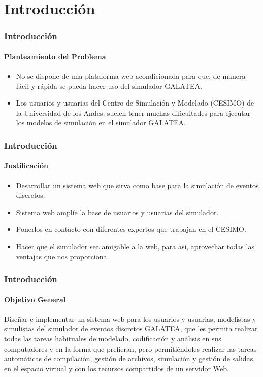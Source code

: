 \documentclass[spanish,xcolor=dvipsnames]{beamer}
\begin{document}
    \section{Introducción}
    \begin{frame}
    	\frametitle{Introducción}
    	\framesubtitle{Planteamiento del Problema}
    	
    	\begin{itemize}
    		\item No se dispone de una plataforma web acondicionada para que, de manera fácil y rápida se pueda hacer uso del simulador GALATEA.
    		\item Los usuarios y usuarias del Centro de Simulación y Modelado (CESIMO) de la Universidad de los Andes, suelen tener muchas dificultades para ejecutar los modelos de simulación en el simulador GALATEA.
    	\end{itemize}

    \end{frame}
    \begin{frame}
    	\frametitle{Introducción}
    	\framesubtitle{Justificación}
    	
    	\begin{itemize}
    		\item Desarrollar un sistema web que sirva como base para la simulación de eventos discretos.
    		\item Sistema web amplíe la base de usuarios y usuarias del simulador.
    		\item Ponerlos en contacto con diferentes expertos que trabajan en el CESIMO.
    		\item Hacer que el simulador sea amigable a la web, para así, aprovechar todas las ventajas que nos proporciona.
    	\end{itemize}
    	
    \end{frame}
    \begin{frame}
    	\frametitle{Introducción}
    	\framesubtitle{Objetivo General}
    	
    	Diseñar e implementar un sistema web para los usuarios y usuarias, modelistas y simulistas  del simulador de eventos discretos GALATEA, que les permita realizar todas las tareas habituales de modelado, codificación y análisis en sus computadores y en la forma que prefieran, pero permitiéndoles realizar las tareas automáticas de compilación, gestión de archivos, simulación y gestión de salidas, en el espacio virtual y con los recursos compartidos de un servidor Web.
    	
    \end{frame}
\end{document}
